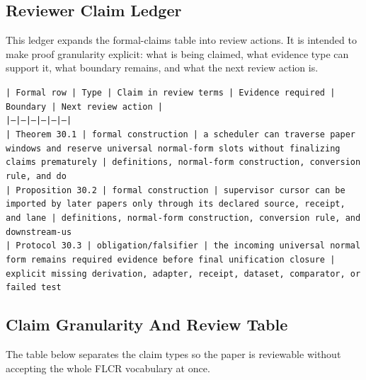 \documentclass[11pt]{article}
\begin{document}
\subsection*{Reviewer Claim Ledger}

This ledger expands the formal-claims table into review actions. It is intended to make proof granularity explicit: what is being claimed, what evidence type can support it, what boundary remains, and what the next review action is.

\noindent\texttt{| Formal row | Type | Claim in review terms | Evidence required | Boundary | Next review action |}\\
\noindent\texttt{|---|---|---|---|---|---|}\\
\noindent\texttt{| Theorem 30.1 | formal construction | a scheduler can traverse paper windows and reserve universal normal-form slots without finalizing claims prematurely | definitions, normal-form construction, conversion rule, and do}\\
\noindent\texttt{| Proposition 30.2 | formal construction | supervisor cursor can be imported by later papers only through its declared source, receipt, and lane | definitions, normal-form construction, conversion rule, and downstream-us}\\
\noindent\texttt{| Protocol 30.3 | obligation/falsifier | the incoming universal normal form remains required evidence before final unification closure | explicit missing derivation, adapter, receipt, dataset, comparator, or failed test }\\

\subsection*{Claim Granularity And Review Table}

The table below separates the claim types so the paper is reviewable without accepting the whole FLCR vocabulary at once.
\end{document}
